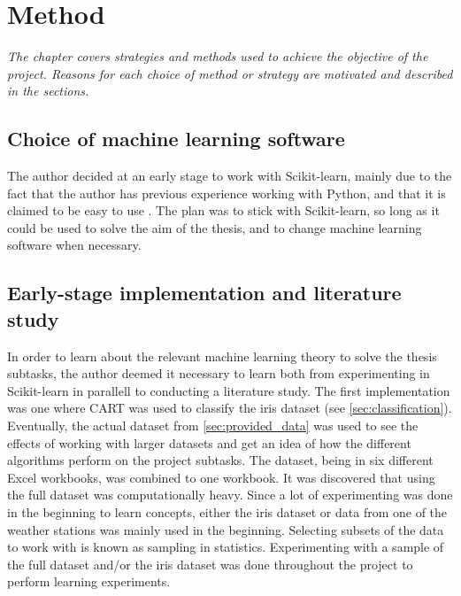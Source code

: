 \chapter{Method}
\emph{The chapter covers strategies and methods used to achieve the objective of the project. Reasons for each choice of method or strategy are motivated and described in the sections.}




\section{Choice of machine learning software}
	The author decided at an early stage to work with Scikit-learn, mainly due to the fact that the author has previous experience working with Python, and that it is claimed to be easy to use \cite{WEBSITE:27}. The plan was to stick with Scikit-learn, so long as it could be used to solve the aim of the thesis, and to change machine learning software when necessary. 

\section{Early-stage implementation and literature study} \label{sec:literature_study}
	In order to learn about the relevant machine learning theory to solve the thesis subtasks, the author deemed it necessary to learn both from experimenting in Scikit-learn in parallell to conducting a literature study. The first implementation was one where CART was used to classify the iris dataset (see \ref{sec:classification}). Eventually, the actual dataset from \ref{sec:provided_data} was used to see the effects of working with larger datasets and get an idea of how the different algorithms perform on the project subtasks. The dataset, being in six different Excel workbooks, was combined to one workbook.  It was discovered that using the full dataset was computationally heavy. Since a lot of experimenting was done in the beginning to learn concepts, either the iris dataset or data from one of the weather stations was mainly used in the beginning. Selecting subsets of the data to work with is known as sampling in statistics. Experimenting with a sample of the full dataset and/or the iris dataset was done throughout the project to perform learning experiments.

